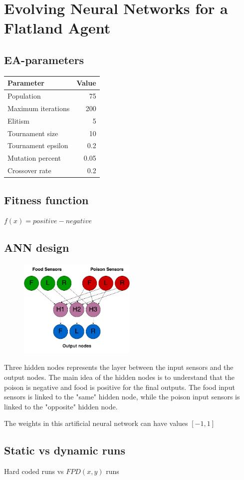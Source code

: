 \section{Evolving Neural Networks for a Flatland Agent}
\subsection{EA-parameters}
\begin{center}

\begin{tabular}{p{5cm} | r}
Parameter & Value \\
\hline
Population & 75 \\
Maximum iterations & 200 \\
Elitism & 5 \\
Tournament size & 10 \\
Tournament epsilon & 0.2 \\
Mutation percent & 0.05 \\
Crossover rate & 0.2 \\
\hline
\end{tabular}
\end{center}

\subsection{Fitness function}
$f(x) = positive - negative$

\subsection{ANN design}
\begin{figure}[h!]
  \centering
    \includegraphics[width=0.5\textwidth]{img/Flatland_network}
\end{figure}

Three hidden nodes represents the layer between the input sensors and the output nodes. The main idea of the hidden nodes is to understand that the poison is negative and food is positive for the final outputs. The food input sensors is linked to the "same" hidden node, while the poison input sensors is linked to the "opposite" hidden node. 

The weights in this artificial neural network can have values $[-1, 1]$ 

\subsection{Static vs dynamic runs}
Hard coded runs vs $FPD(x, y)$ runs

